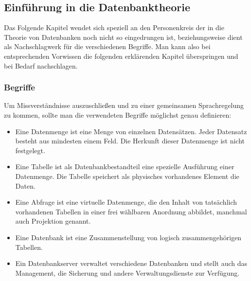 \subsection{Einführung in die Datenbanktheorie}
Das Folgende Kapitel wendet sich speziell an den Personenkreis der in die Theorie von Datenbanken noch nicht so eingedrungen ist, beziehungsweise dient als Nachschlagwerk für die verschiedenen Begriffe. Man kann also bei entsprechenden Vorwissen die folgenden erklärenden Kapitel überspringen und bei Bedarf nachschlagen.

\subsubsection{Begriffe}
Um Missverständnisse auszuschließen und zu einer gemeinsamen Sprachregelung zu kommen, sollte man die verwendeten Begriffe möglichst genau definieren:

\begin{itemize}
	\item Eine Datenmenge\label{Datenmenge} ist eine Menge von einzelnen Datensätzen. Jeder Datensatz besteht aus mindesten einem Feld. Die Herkunft dieser Datenmenge ist nicht festgelegt.
  \item Eine Tabelle\label{Tabelle} ist als Datenbankbestandteil eine spezielle Ausführung einer Datenmenge. Die Tabelle speichert als physisches vorhandenes Element die Daten.
  \item Eine Abfrage ist eine virtuelle Datenmenge, die den Inhalt von tatsächlich vorhandenen Tabellen in einer frei wählbaren Anordnung abbildet, manchmal auch Projektion genannt.
  \item Eine Datenbank ist eine Zusammenstellung von logisch zusammengehörigen Tabellen.
  \item Ein Datenbankserver verwaltet verschiedene Datenbanken und stellt auch das Management, die Sicherung und andere Verwaltungsdienste zur Verfügung.
\end{itemize}

